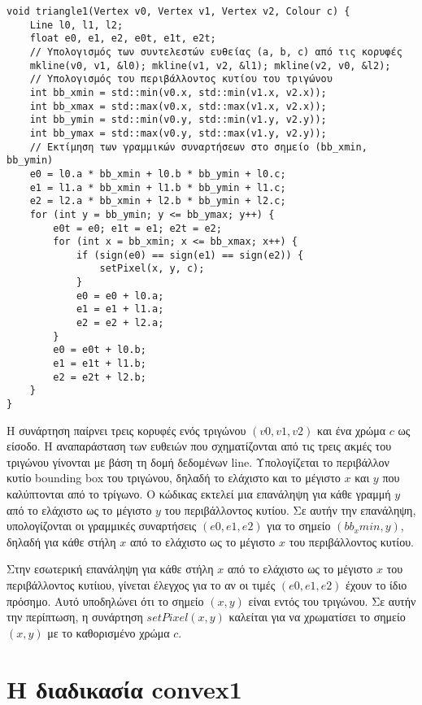\begin{verbatim}
void triangle1(Vertex v0, Vertex v1, Vertex v2, Colour c) {
    Line l0, l1, l2;
    float e0, e1, e2, e0t, e1t, e2t;
    // Υπολογισμός των συντελεστών ευθείας (a, b, c) από τις κορυφές
    mkline(v0, v1, &l0); mkline(v1, v2, &l1); mkline(v2, v0, &l2);
    // Υπολογισμός του περιβάλλοντος κυτίου του τριγώνου
    int bb_xmin = std::min(v0.x, std::min(v1.x, v2.x));
    int bb_xmax = std::max(v0.x, std::max(v1.x, v2.x));
    int bb_ymin = std::min(v0.y, std::min(v1.y, v2.y));
    int bb_ymax = std::max(v0.y, std::max(v1.y, v2.y));
    // Εκτίμηση των γραμμικών συναρτήσεων στο σημείο (bb_xmin, bb_ymin)
    e0 = l0.a * bb_xmin + l0.b * bb_ymin + l0.c;
    e1 = l1.a * bb_xmin + l1.b * bb_ymin + l1.c;
    e2 = l2.a * bb_xmin + l2.b * bb_ymin + l2.c;
    for (int y = bb_ymin; y <= bb_ymax; y++) {
        e0t = e0; e1t = e1; e2t = e2;
        for (int x = bb_xmin; x <= bb_xmax; x++) {
            if (sign(e0) == sign(e1) == sign(e2)) {
                setPixel(x, y, c);
            }
            e0 = e0 + l0.a;
            e1 = e1 + l1.a;
            e2 = e2 + l2.a;
        }
        e0 = e0t + l0.b;
        e1 = e1t + l1.b;
        e2 = e2t + l2.b;
    }
}
\end{verbatim} 
\par
Η συνάρτηση παίρνει τρεις κορυφές ενός τριγώνου $(v0,v1,v2)$ και ένα χρώμα $c$ ως είσοδο. Η αναπαράσταση των ευθειών που σχηματίζονται από τις τρεις ακμές του τριγώνου γίνονται με βάση τη δομή δεδομένων \textlatin{line}. Υπολογίζεται το περιβάλλον κυτίο \textlatin{bounding box} του τριγώνου, δηλαδή το ελάχιστο και το μέγιστο $x$ και $y$ που καλύπτονται από το τρίγωνο. Ο κώδικας εκτελεί μια επανάληψη για κάθε γραμμή $y$ από το ελάχιστο ως το μέγιστο $y$ του περιβάλλοντος κυτίου. Σε αυτήν την επανάληψη, υπολογίζονται οι γραμμικές συναρτήσεις $(e0,e1,e2)$ για το σημείο $(bb_xmin, y)$, δηλαδή για κάθε στήλη $x$ από το ελάχιστο ως το μέγιστο $x$ του περιβάλλοντος κυτίου. 
\par
Στην εσωτερική επανάληψη για κάθε στήλη $x$ από το ελάχιστο ως το μέγιστο $x$ του περιβάλλοντος κυτίιου, γίνεται έλεγχος για το αν οι τιμές $(e0,e1,e2)$ έχουν το ίδιο πρόσημο. Αυτό υποδηλώνει ότι το σημείο $(x,y)$ είναι εντός του τριγώνου. Σε αυτήν την περίπτωση, η συνάρτηση $setPixel(x,y)$ καλείται για να χρωματίσει το σημείο $(x,y)$ με το καθορισμένο χρώμα $c$. 

\section{Η διαδικασία \textlatin{convex1}} 

